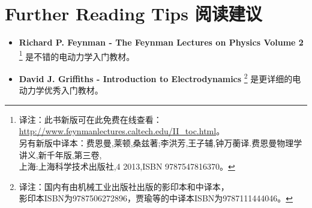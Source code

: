 \section*{Further Reading Tips \quad 阅读建议}
\begin{itemize}
    \item {\bf Richard P. Feynman - The Feynman Lectures on Physics Volume 2}%
    \footnote{译注：此书新版可在此免费在线查看： \url{http://www.feynmanlectures.caltech.edu/II_toc.html}。\\另有新版中译本：费恩曼,莱顿,桑兹著;李洪芳,王子辅,钟万蘅译.费恩曼物理学讲义,新千年版,第三卷,\\上海:上海科学技术出版社,4 2013,ISBN 9787547816370。} %
    是不错的电动力学入门教材。
    \item {\bf David J. Griffiths - Introduction to Electrodynamics}%
    \footnote{译注：国内有由机械工业出版社出版的影印本和中译本，\\影印本ISBN为9787506272896，贾瑜等的中译本ISBN为9787111444046。}%
    是更详细的电动力学优秀入门教材。
\end{itemize}

